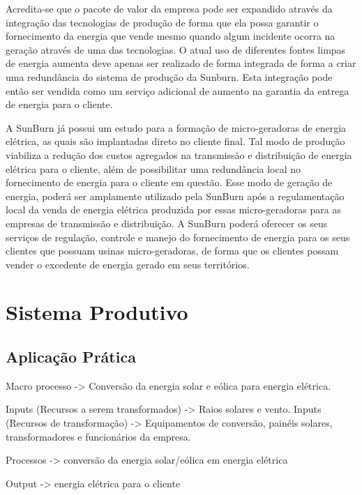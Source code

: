 Acredita-se que o pacote de valor da empresa pode ser expandido através da integração das tecnologias de produção de forma que ela possa garantir o fornecimento da energia que vende mesmo quando algum incidente ocorra na geração através de uma das tecnologias. O atual uso de diferentes fontes limpas de energia aumenta deve apenas ser realizado de forma integrada de forma a criar uma redundância do sistema de produção da Sunburn. Esta integração pode então ser vendida como um serviço adicional de aumento na garantia da entrega de energia para o cliente.

A SunBurn já possui um estudo para a formação de micro-geradoras de energia elétrica, as quais são implantadas direto no cliente final. Tal modo de produção viabiliza a redução dos custos agregados na transmissão e distribuição de energia elétrica para o cliente, além de possibilitar uma redundância local no fornecimento de energia para o cliente em questão. Esse modo de geração de energia, poderá ser amplamente utilizado pela SunBurn após a regulamentação local da venda de energia elétrica produzida por essas micro-geradoras para as empresas de transmissão e distribuição. A SunBurn poderá oferecer os seus serviços de regulação, controle e manejo do fornecimento de energia para os seus clientes que possuam usinas micro-geradoras, de forma que os clientes possam vender o excedente de energia gerado em seus territórios.

\section{Sistema Produtivo}
\label{sec:sisprod}

\subsection{Aplicação Prática}
\label{subsec:app2}
Macro processo -> Conversão da energia solar e eólica para  energia elétrica.

Inputs (Recursos a serem transformados) -> Raios solares e vento.
Inputs (Recursos de transformação) -> Equipamentos de conversão, painéis solares, transformadores e funcionários da empresa.

Processos -> conversão da energia solar/eólica em energia elétrica

Output -> energia elétrica para o cliente